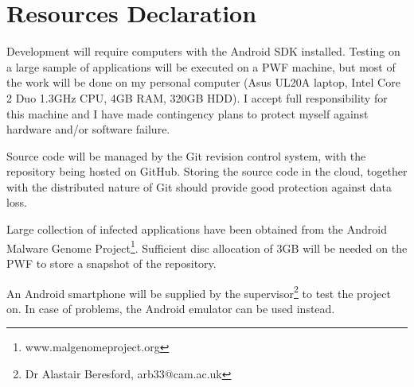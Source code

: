 \documentclass[12pt]{article}
\begin{document}
\begin{itemize}
\end{itemize}

\section*{Resources Declaration}

Development will require computers with the Android SDK installed. 
Testing on a large sample of applications will be executed on a 
PWF machine, but most of the work will be done on my personal computer 
(Asus UL20A laptop, Intel Core 2 Duo 1.3GHz CPU, 4GB RAM, 320GB HDD). 
I accept full responsibility for this machine and I have made contingency 
plans to protect myself against hardware and/or software failure.

Source code will be managed by the Git revision control system, with
the repository being hosted on GitHub. Storing the source code in the
cloud, together with the distributed nature of Git should provide
good protection against data loss.

Large collection of infected applications have been obtained from the
Android Malware Genome Project\footnote{www.malgenomeproject.org}. 
Sufficient disc allocation of 3GB will be needed on the PWF to store
a snapshot of the repository. 

An Android smartphone will be supplied by the supervisor\footnote
{Dr Alastair Beresford, arb33@cam.ac.uk} to test the project on. In case 
of problems, the Android emulator can be used instead.

\end{document}
